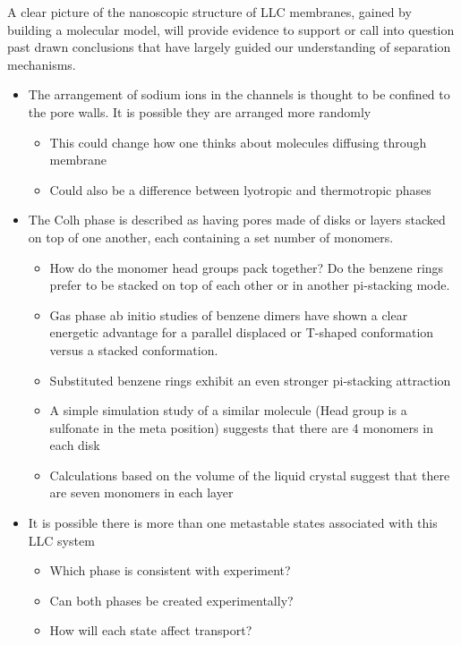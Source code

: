 \documentclass{article}
\begin{document}
	A clear picture of the nanoscopic structure of LLC membranes, gained by building 
a molecular model, will provide evidence to support or call into question past drawn conclusions that have largely guided our understanding of separation mechanisms. 
	\begin{itemize}
 		\item The arrangement of sodium ions in the channels is thought to be confined to the pore walls. It is possible they are arranged more randomly
		\begin{itemize}
			\item This could change how one thinks about molecules diffusing through membrane
			\item Could also be a difference between lyotropic and thermotropic phases
		\end{itemize}
		\item The Colh phase is described as having pores made of disks or layers stacked on top of one another, each containing a set number of monomers. 
		\begin{itemize}
			\item How do the monomer head groups pack together? Do the benzene rings prefer to be stacked on top of each other or in another pi-stacking mode.
			\item Gas phase ab initio studies of benzene dimers have shown a clear energetic advantage for a parallel displaced or T-shaped conformation versus a stacked conformation. 
			\item Substituted benzene rings exhibit an even stronger pi-stacking attraction %
			\item A simple simulation study of a similar molecule (Head group is a sulfonate in the meta position) suggests that there are 4 monomers in each disk
			\item Calculations based on the volume of the liquid crystal suggest that there are seven monomers in each layer %
		\end{itemize}
		\item It is possible there is more than one metastable states associated with this LLC system
		\begin{itemize}
			\item Which phase is consistent with experiment?
			\item Can both phases be created experimentally?
			\item How will each state affect transport?
		\end{itemize}
	\end{itemize}
	
\end{document}
